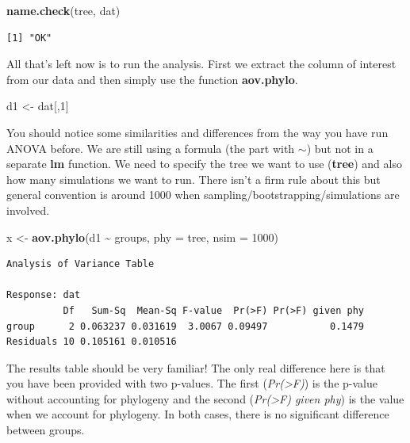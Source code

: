 \documentclass[
]{book}
\newenvironment{Shaded}{\begin{snugshade}}{\end{snugshade}}
\newcommand{\DataTypeTok}[1]{\textcolor[rgb]{0.13,0.29,0.53}{#1}}
\newcommand{\DecValTok}[1]{\textcolor[rgb]{0.00,0.00,0.81}{#1}}
\newcommand{\KeywordTok}[1]{\textcolor[rgb]{0.13,0.29,0.53}{\textbf{#1}}}
\newcommand{\NormalTok}[1]{#1}
\newcommand{\OperatorTok}[1]{\textcolor[rgb]{0.81,0.36,0.00}{\textbf{#1}}}
\newcommand{\StringTok}[1]{\textcolor[rgb]{0.31,0.60,0.02}{#1}}
\begin{document}
\begin{Shaded}
\begin{Highlighting}[]
\KeywordTok{name.check}\NormalTok{(tree, dat)}
\end{Highlighting}
\end{Shaded}

\begin{verbatim}
[1] "OK"
\end{verbatim}

All that's left now is to run the analysis. First we extract the column of interest from our data and then simply use the function \textbf{aov.phylo}.

\begin{Shaded}
\begin{Highlighting}[]
\NormalTok{d1 \textless{}{-}}\StringTok{ }\NormalTok{dat[,}\DecValTok{1}\NormalTok{]}
\end{Highlighting}
\end{Shaded}

You should notice some similarities and differences from the way you have run ANOVA before. We are still using a formula (the part with \(\sim\)) but not in a separate \textbf{lm} function. We need to specify the tree we want to use (\textbf{tree}) and also how many simulations we want to run. There isn't a firm rule about this but general convention is around 1000 when sampling/bootstrapping/simulations are involved.

\begin{Shaded}
\begin{Highlighting}[]
\NormalTok{x \textless{}{-}}\StringTok{ }\KeywordTok{aov.phylo}\NormalTok{(d1 }\OperatorTok{\textasciitilde{}}\StringTok{ }\NormalTok{groups, }\DataTypeTok{phy =}\NormalTok{ tree, }\DataTypeTok{nsim =} \DecValTok{1000}\NormalTok{)}
\end{Highlighting}
\end{Shaded}

\begin{verbatim}
Analysis of Variance Table

Response: dat
          Df   Sum-Sq  Mean-Sq F-value  Pr(>F) Pr(>F) given phy
group      2 0.063237 0.031619  3.0067 0.09497           0.1479
Residuals 10 0.105161 0.010516                                 
\end{verbatim}

The results table should be very familiar! The only real difference here is that you have been provided with two p-values. The first (\emph{Pr(\textgreater F)}) is the p-value without accounting for phylogeny and the second (\emph{Pr(\textgreater F) given phy}) is the value when we account for phylogeny. In both cases, there is no significant difference between groups.
\end{document}
